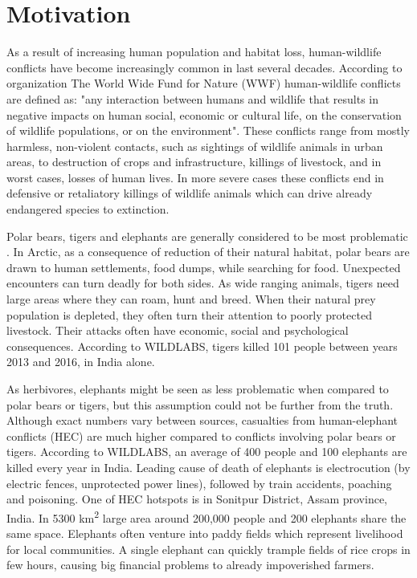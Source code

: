\section{ Motivation}

As a result of increasing human population and habitat loss, human-wildlife conflicts have become increasingly common in last several decades\cite{philip-wildlife}.
According to organization The World Wide Fund for Nature (WWF) human-wildlife conflicts are defined as: "any interaction between humans and wildlife that results in negative impacts on human social, economic or cultural life, on the conservation of wildlife populations, or on the environment"\cite{conflict-manual}.
These conflicts range from mostly harmless, non-violent contacts, such as sightings of wildlife animals in urban areas, to destruction of crops and infrastructure, killings of livestock, and in worst cases, losses of human lives.
In more severe cases these conflicts end in defensive or retaliatory killings of wildlife animals which can drive already endangered species to extinction.

Polar bears, tigers and elephants are generally considered to be most problematic \cite{philip-wildlife}.
In Arctic, as a consequence of reduction of their natural habitat, polar bears are drawn to human settlements, food dumps, while searching for food\cite{wildlabs-polarbears}.
Unexpected encounters can turn deadly for both sides.
As wide ranging animals, tigers need large areas where they can roam, hunt and breed\cite{wildlabs-tigers}.
When their natural prey population is depleted, they often turn their attention to poorly protected livestock. 
Their attacks often have economic, social and psychological consequences.
According to WILDLABS, tigers killed 101 people between years 2013 and 2016, in India alone\cite{wildlabs-tigers}.

As herbivores, elephants might be seen as less problematic when compared to polar bears or tigers, but this assumption could not be further from the truth.
Although exact numbers vary between sources, casualties from human-elephant conflicts (HEC) are much higher compared to conflicts involving polar bears or tigers.
According to WILDLABS, an average of 400 people and 100 elephants are killed every year in India\cite{wildlabs-elephants}. 
Leading cause of death of elephants is electrocution (by electric fences, unprotected power lines), followed by train accidents, poaching and poisoning\cite{cause-of-death}.
One of HEC hotspots is in Sonitpur District, Assam province, India. 
In 5300 km\textsuperscript{2} large area around 200,000 people and 200 elephants share the same space\cite{wildlabs-elephants}.
Elephants often venture into paddy fields which represent livelihood for local communities.
A single elephant can quickly trample fields of rice crops in few hours, causing big financial problems to already impoverished farmers\cite{wildlabs-elephants}.

